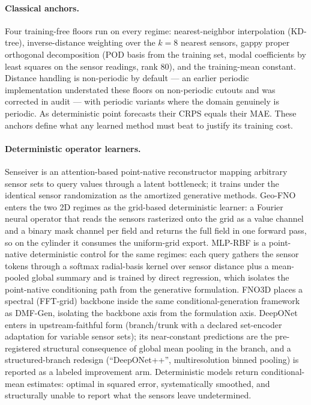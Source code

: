 \documentclass[aip,pof,reprint,amsmath,amssymb,superscriptaddress]{revtex4-1}
\newcommand{\dmfgen}{DMF-Gen}
\begin{document}
\paragraph{Classical anchors.} Four training-free floors run on every regime:
nearest-neighbor interpolation (KD-tree), inverse-distance weighting over the
$k=8$ nearest sensors, gappy proper orthogonal
decomposition\cite{everson1995karhunen} (POD basis from the training set,
modal coefficients by least squares on the sensor readings, rank 80), and the
training-mean constant. Distance handling is non-periodic by default --- an
earlier periodic implementation understated these floors on non-periodic
cutouts and was corrected in audit --- with periodic variants where the domain
genuinely is periodic. As deterministic point forecasts their CRPS equals
their MAE. These anchors define what any learned method must beat to justify
its training cost.

\paragraph{Deterministic operator learners.} Senseiver\cite{santos2023senseiver}
is an attention-based point-native reconstructor mapping arbitrary sensor sets
to query values through a latent bottleneck; it trains under the identical
sensor randomization as the amortized generative methods. Geo-FNO
enters the two 2D regimes as the grid-based deterministic learner: a Fourier
neural operator\cite{li2021fourier,li2023geofno} that reads the sensors
rasterized onto the grid as a value channel and a binary mask channel per
field and returns the full field in one forward pass, so on the cylinder it
consumes the uniform-grid export. MLP-RBF is a point-native deterministic
control for the same regimes: each query gathers the sensor tokens through a
softmax radial-basis kernel over sensor distance plus a mean-pooled global
summary and is trained by direct regression, which isolates the point-native
conditioning path from the generative formulation. FNO3D places a
spectral (FFT-grid) backbone inside the same conditional-generation framework
as \dmfgen{}, isolating the backbone axis from the formulation axis.
DeepONet\cite{lu2021learning} enters in upstream-faithful form (branch/trunk
with a declared set-encoder adaptation for variable sensor sets); its
near-constant predictions are the pre-registered structural consequence of
global mean pooling in the branch, and a structured-branch redesign
(``DeepONet++'', multiresolution binned pooling) is reported as a labeled
improvement arm. Deterministic models return conditional-mean estimates:
optimal in squared error, systematically smoothed, and structurally unable to
report what the sensors leave undetermined.
\end{document}
